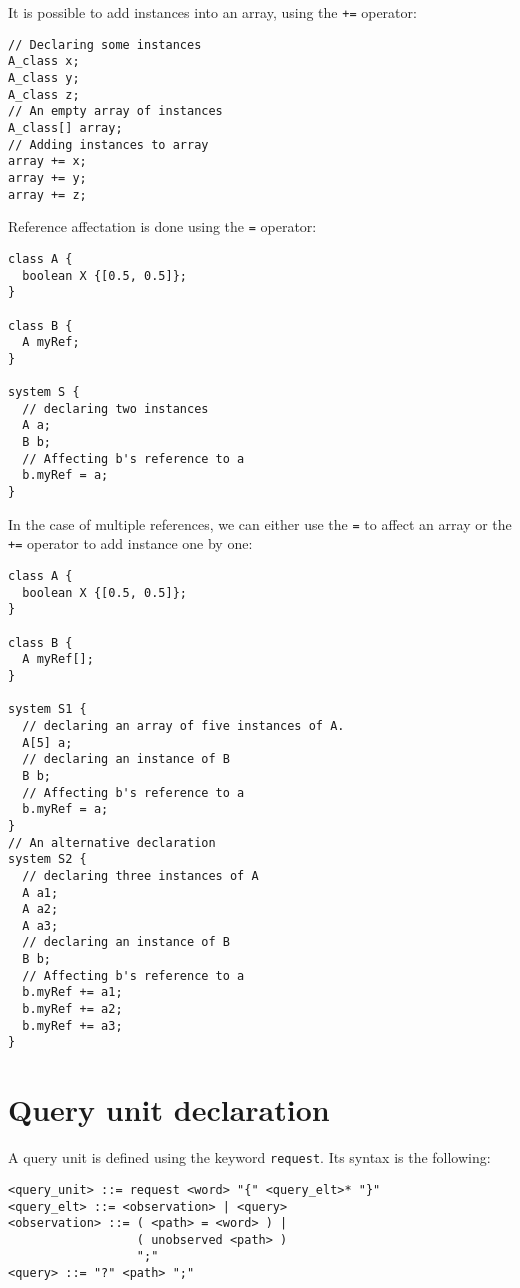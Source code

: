 \documentclass[singlespacing,12pt,a4paper]{article}
\begin{document}
It is possible to add instances into an array, using the \verb-+=- operator:

\begin{footnotesize}
\begin{verbatim}
// Declaring some instances
A_class x;
A_class y;
A_class z;
// An empty array of instances
A_class[] array;
// Adding instances to array
array += x;
array += y;
array += z;
\end{verbatim}
\end{footnotesize}

Reference affectation is done using the \verb+=+ operator:

\begin{footnotesize}
\begin{verbatim}
class A {
  boolean X {[0.5, 0.5]};
}

class B {
  A myRef;
}

system S {
  // declaring two instances
  A a;
  B b;
  // Affecting b's reference to a
  b.myRef = a;
}
\end{verbatim}
\end{footnotesize}

In the case of multiple references, we can either use the \verb+=+ to affect
an array or the \verb-+=- operator to add instance one by one:

\begin{footnotesize}
\begin{verbatim}
class A {
  boolean X {[0.5, 0.5]};
}

class B {
  A myRef[];
}

system S1 {
  // declaring an array of five instances of A.
  A[5] a;
  // declaring an instance of B
  B b;
  // Affecting b's reference to a
  b.myRef = a;
}
// An alternative declaration
system S2 {
  // declaring three instances of A
  A a1;
  A a2;
  A a3;
  // declaring an instance of B
  B b;
  // Affecting b's reference to a
  b.myRef += a1;
  b.myRef += a2;
  b.myRef += a3;
}
\end{verbatim}
\end{footnotesize}

\section{Query unit declaration}

A query unit is defined using the keyword \verb+request+. Its syntax is the
following:

\begin{footnotesize}
\begin{verbatim}
<query_unit> ::= request <word> "{" <query_elt>* "}"
<query_elt> ::= <observation> | <query>
<observation> ::= ( <path> = <word> ) |
                  ( unobserved <path> )
                  ";"
<query> ::= "?" <path> ";"
\end{verbatim}
\end{footnotesize}
\end{document}
